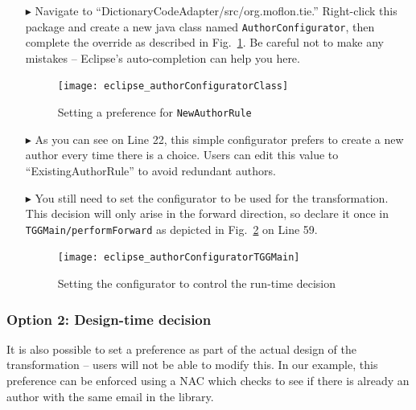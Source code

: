 \begin{itemize}

\item[$\blacktriangleright$] Navigate to ``DictionaryCodeAdapter/src/org.moflon.tie.'' Right-click this package and create a new java class named
\texttt{Author\-Config\-ur\-at\-or}, then complete the override as described in Fig.~\ref{eclipse:authorConfig}. Be careful not to make any mistakes --
Eclipse's auto-completion can help you here.

\begin{figure}[htbp]
\begin{center}
  \texttt{[image: eclipse\_authorConfiguratorClass]}
  \caption{Setting a preference for \texttt{NewAuthorRule}}
  \label{eclipse:authorConfig}
\end{center}
\end{figure}

\clearpage

\item[$\blacktriangleright$] As you can see on Line 22, this simple configurator prefers to create a new author every time there is a choice. Users can
edit this value to ``ExistingAuthorRule'' to avoid redundant authors.

\item[$\blacktriangleright$] You still need to set the configurator to be used for the transformation. This decision will only arise in the forward
direction, so declare it once in \texttt{TGGMain/performForward} as depicted in Fig.~\ref{eclipse:editTGGMain} on Line 59.

\vspace{0.5cm}

\begin{figure}[htbp]
\begin{center}
  \texttt{[image: eclipse\_authorConfiguratorTGGMain]}
  \caption{Setting the configurator to control the run-time decision}
  \label{eclipse:editTGGMain}
\end{center}
\end{figure}

\end{itemize}

\subsubsection{Option 2: Design-time decision}

It is also possible to set a preference as part of the actual design of the transformation -- users will not be able to modify this. In our example, this
preference can be enforced using a NAC which checks to see if there is already an author with the same email in the library.

